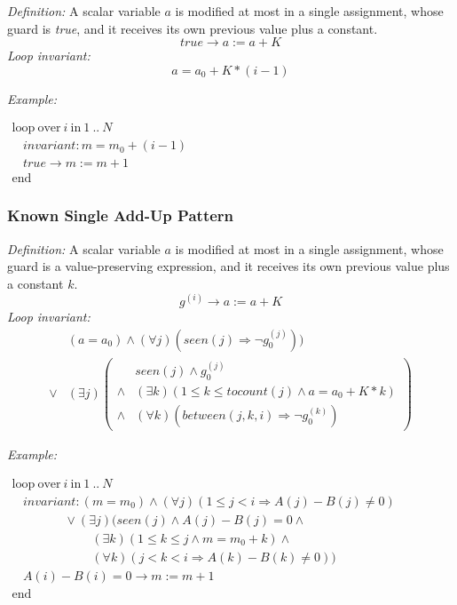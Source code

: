 \documentclass[a4paper,10pt]{article}
\newcommand{\idx}{\ensuremath{i}\xspace}
\newcommand{\at}[1]{{(#1)}}
\newcommand{\KWloop}{\ensuremath{\mathrm{loop}~}}
\newcommand{\KWend}{\ensuremath{\mathrm{end}~}}
\newcommand{\KWover}{\ensuremath{\mathrm{over}~}}
\newcommand{\KWin}{\ensuremath{~\mathrm{in}~}}
\newcommand{\impl}{\ensuremath{\Longrightarrow}}
\newcommand{\seen}[1]{\ensuremath{\mathit{seen}(#1)}\xspace}
\newcommand{\tocount}[1]{\ensuremath{\mathit{tocount}(#1)}\xspace}
\newcommand{\between}[3]{\ensuremath{\mathit{between}{(#1,#2,#3)}}\xspace}
\newcommand{\loopinvariant}{\noindent\textit{Loop invariant:}\xspace}
\newcommand{\patterndef}{\noindent\textit{Definition:}\xspace}
\newcommand{\patternexample}{\noindent\textit{Example:}\xspace}
\begin{document}
\patterndef A scalar variable $a$ is modified at most in a single assignment, whose
guard is \textit{true}, and it receives its own previous value plus a constant.
%
$$\mathit{true} \rightarrow a := a + K$$
%
\loopinvariant
%
$$a = a_0 + K * (i-1)$$

\bigskip
\patternexample

\medskip
$\begin{array}{l}
  \KWloop \KWover i \KWin 1~..~N \\
  ~~~~ \textit{invariant}: m = m_0 + (i-1)\\
  ~~~~ true \rightarrow m := m+1\\
  \KWend
\end{array}$

\subsubsection*{Known Single Add-Up Pattern}

\patterndef A scalar variable $a$ is modified at most in a single assignment, whose
guard is a value-preserving expression, and it receives its own previous value plus a constant $k$.
%
$$g^\at{\idx} \rightarrow a := a + K$$
%
\loopinvariant
%
\begin{eqnarray*}
&(a = a_0) \land (\forall j)(\seen{j} \impl \neg g_0^\at{j})) \\
\lor 
& (\exists j)
\left(\begin{array}{cl}
&\seen{j} \land g_0^\at{j}\\
 \land& (\exists k)(1 \leq k \leq \tocount{j} \land a = a_0 + K * k) \\
\land& (\forall k)(\between{j}{k}{\idx} \impl \neg g_0^\at{k})
\end{array}\right)
\end{eqnarray*}

\bigskip
\patternexample

\medskip
$\begin{array}{l}
  \KWloop \KWover i \KWin 1~..~N \\
  ~~~~ \textit{invariant}: (m = m_0) \land (\forall j)(1\leq j < i \impl A(j)-B(j)\neq0)\\
  ~~~~~~~~~~~~~~~~~~~ \lor (\exists j)(\seen{j} \land A(j)-B(j)= 0 \land \\
  ~~~~~~~~~~~~~~~~~~~~~~~~~~~~~ (\exists k)(1 \leq k \leq j \land m = m_0 + k) \land\\
  ~~~~~~~~~~~~~~~~~~~~~~~~~~~~~ (\forall k)(j < k < i \impl A(k)-B(k)\neq0))\\
  ~~~~ A(i)-B(i)=0 \rightarrow m := m+1\\
  \KWend
\end{array}$
\end{document}

